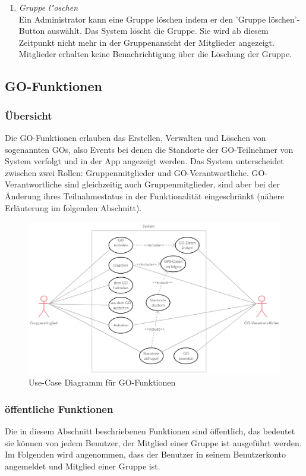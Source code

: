 \documentclass[parskip=full]{scrartcl}
\def\threedigits#1{%
  \ifnum#1<100 0\fi
  \ifnum#1<10 0\fi
  \number#1}
\begin{document}
\begin{enumerate}[label={\textbf{/F\protect\threedigits{\theenumi}0/}}, leftmargin=*, resume]
	\item \textit{Gruppe l"oschen}\label{Gruppe löschen} \\
	Ein Administrator kann eine Gruppe löschen indem er den 'Gruppe löschen'-Button auswählt. Das System löscht die Gruppe. Sie wird ab diesem Zeitpunkt nicht mehr in der Gruppenansicht der Mitglieder angezeigt. Mitglieder erhalten keine Benachrichtigung über die Löschung der Gruppe.
	
\end{enumerate}
	
\subsection{GO-Funktionen}

\subsubsection{Übersicht}
Die GO-Funktionen erlauben das Erstellen, Verwalten und Löschen von sogenannten GOs, also Events bei denen die Standorte der GO-Teilnehmer von System verfolgt und in der App angezeigt werden. Das System unterscheidet zwischen zwei Rollen: Gruppenmitglieder und GO-Verantwortliche. GO-Verantwortliche sind gleichzeitig auch Gruppenmitglieder, sind aber bei der Änderung ihres Teilnahmestatus in der Funktionalität eingeschränkt (nähere Erläuterung im folgenden Abschnitt).

	\begin{figure}[H]
		\centering
		\includegraphics[width=1\textwidth]{Use_Cases/use_case_GO.png}
		\caption{Use-Case Diagramm für GO-Funktionen}
	\end{figure}

 

\subsubsection{öffentliche Funktionen}
Die in diesem Abschnitt beschriebenen Funktionen sind öffentlich, das bedeutet sie können von jedem Benutzer, der Mitglied einer Gruppe ist ausgeführt werden.
Im Folgenden wird angenommen, dass der Benutzer in seinem Benutzerkonto angemeldet und Mitglied einer Gruppe ist.
\end{document}
